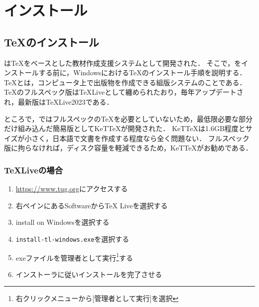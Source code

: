 
\addtocounter{page}{-1}

\chapter{インストール}

\section{{\TeX}のインストール}

{\ketcindy}は{\TeX}をベースとした教材作成支援システムとして開発された．
そこで，{\ketcindy}をインストールする前に，Windowsにおける{\TeX}のインストール手順を説明する．
{\TeX}とは，コンピュータ上で出版物を作成できる組版システムのことである．
{\TeX}のフルスペック版は{\TeX}Liveとして纏められたおり，毎年アップデートされ，最新版は{\TeX}Live2023である．

ところで，{\ketcindy}ではフルスペックの{\TeX}を必要としていないため，最低限必要な部分だけ組み込んだ簡易版としてKeT{\TeX}が開発された．
KeT{\TeX}は1.6GB程度とサイズが小さく，日本語で文書を作成する程度なら全く問題ない．
フルスペック版に拘らなければ，ディスク容量を軽減できるため，KeT{\TeX}がお勧めである．

\subsection{{\TeX}Liveの場合}

\begin{enumerate}
    \item \url{https://www.tug.org}にアクセスする
    \item 右ペインにあるSoftwareからTeX Liveを選択する
    \item install on Windowsを選択する
    \item \verb|install-tl-windows.exe|を選択する
    \item exeファイルを管理者として実行\footnote{右クリックメニューから[管理者として実行]を選択}する
    \item インストーラに従いインストールを完了させる
\end{enumerate}

